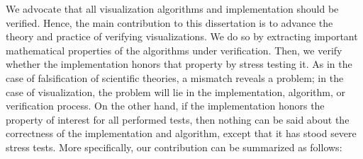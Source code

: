 We advocate that all visualization algorithms and implementation should be verified.
Hence, the main contribution to this dissertation is to advance the theory and practice of verifying visualizations. We do so by extracting important mathematical properties of the algorithms under verification. Then, we verify whether the implementation honors that property by stress testing it. As in the case of falsification of scientific theories, a mismatch reveals a problem; in the case of visualization, the problem will lie in the implementation, algorithm, or verification process. On the other hand, if the implementation honors the property of interest for all performed tests, then nothing can be said about the correctness of the implementation and algorithm, except that it has stood severe stress tests. More specifically, our contribution can be summarized as follows:
